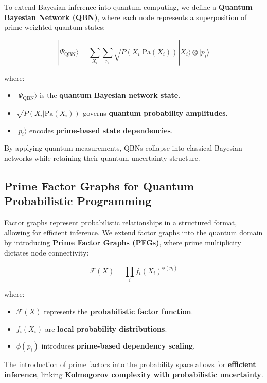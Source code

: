 \documentclass{article}
\theoremstyle{plain}
\theoremstyle{plain}
\theoremstyle{definition}
\theoremstyle{remark}
\begin{document}
To extend Bayesian inference into quantum computing, we define a \textbf{Quantum Bayesian Network (QBN)}, where each node represents a superposition of prime-weighted quantum states:

\begin{equation}
|\Psi_{\text{QBN}} \rangle = \sum_{X_i} \sum_{p_i} \sqrt{P(X_i | \text{Pa}(X_i))} |X_i\rangle \otimes |p_i\rangle
\end{equation}

where:
\begin{itemize}
    \item $|\Psi_{\text{QBN}} \rangle$ is the \textbf{quantum Bayesian network state}.
    \item $\sqrt{P(X_i | \text{Pa}(X_i))}$ governs \textbf{quantum probability amplitudes}.
    \item $|p_i\rangle$ encodes \textbf{prime-based state dependencies}.
\end{itemize}

By applying quantum measurements, QBNs collapse into classical Bayesian networks while retaining their quantum uncertainty structure.

\subsection{Prime Factor Graphs for Quantum Probabilistic Programming}

Factor graphs represent probabilistic relationships in a structured format, allowing for efficient inference. We extend factor graphs into the quantum domain by introducing \textbf{Prime Factor Graphs (PFGs)}, where prime multiplicity dictates node connectivity:

\begin{equation}
\mathcal{F}(X) = \prod_{i} f_i (X_i)^{\phi(p_i)}
\end{equation}

where:
\begin{itemize}
    \item $\mathcal{F}(X)$ represents the \textbf{probabilistic factor function}.
    \item $f_i (X_i)$ are \textbf{local probability distributions}.
    \item $\phi(p_i)$ introduces \textbf{prime-based dependency scaling}.
\end{itemize}

The introduction of prime factors into the probability space allows for \textbf{efficient inference}, linking \textbf{Kolmogorov complexity with probabilistic uncertainty}.
\end{document}
